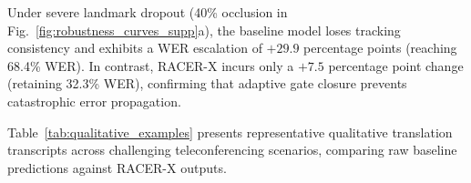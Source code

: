 \documentclass[10pt,conference]{IEEEtran}
\begin{document}
Under severe landmark dropout (40\% occlusion in Fig.~\ref{fig:robustness_curves_supp}a), the baseline model loses tracking consistency and exhibits a WER escalation of $+29.9$ percentage points (reaching 68.4\% WER). In contrast, RACER-X incurs only a $+7.5$ percentage point change (retaining 32.3\% WER), confirming that adaptive gate closure prevents catastrophic error propagation.

Table~\ref{tab:qualitative_examples} presents representative qualitative translation transcripts across challenging teleconferencing scenarios, comparing raw baseline predictions against RACER-X outputs.

\begin{table}[!htbp]
\centering
\caption{Qualitative Translation Outputs Across Stress Conditions}
\label{tab:qualitative_examples}
\end{table}
\end{document}
